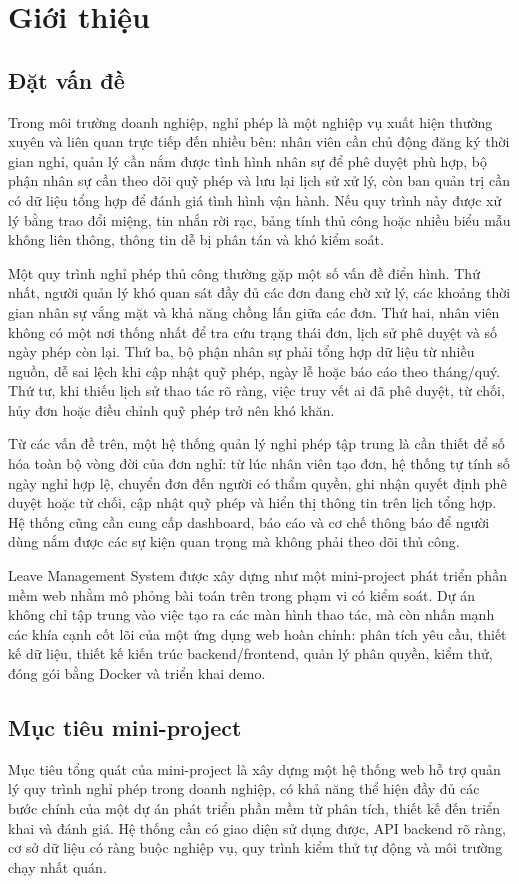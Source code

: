\chapter{Giới thiệu}

\section{Đặt vấn đề}
Trong môi trường doanh nghiệp, nghỉ phép là một nghiệp vụ xuất hiện thường xuyên và liên quan trực tiếp đến nhiều bên: nhân viên cần chủ động đăng ký thời gian nghỉ, quản lý cần nắm được tình hình nhân sự để phê duyệt phù hợp, bộ phận nhân sự cần theo dõi quỹ phép và lưu lại lịch sử xử lý, còn ban quản trị cần có dữ liệu tổng hợp để đánh giá tình hình vận hành. Nếu quy trình này được xử lý bằng trao đổi miệng, tin nhắn rời rạc, bảng tính thủ công hoặc nhiều biểu mẫu không liên thông, thông tin dễ bị phân tán và khó kiểm soát.

Một quy trình nghỉ phép thủ công thường gặp một số vấn đề điển hình. Thứ nhất, người quản lý khó quan sát đầy đủ các đơn đang chờ xử lý, các khoảng thời gian nhân sự vắng mặt và khả năng chồng lấn giữa các đơn. Thứ hai, nhân viên không có một nơi thống nhất để tra cứu trạng thái đơn, lịch sử phê duyệt và số ngày phép còn lại. Thứ ba, bộ phận nhân sự phải tổng hợp dữ liệu từ nhiều nguồn, dễ sai lệch khi cập nhật quỹ phép, ngày lễ hoặc báo cáo theo tháng/quý. Thứ tư, khi thiếu lịch sử thao tác rõ ràng, việc truy vết ai đã phê duyệt, từ chối, hủy đơn hoặc điều chỉnh quỹ phép trở nên khó khăn.

Từ các vấn đề trên, một hệ thống quản lý nghỉ phép tập trung là cần thiết để số hóa toàn bộ vòng đời của đơn nghỉ: từ lúc nhân viên tạo đơn, hệ thống tự tính số ngày nghỉ hợp lệ, chuyển đơn đến người có thẩm quyền, ghi nhận quyết định phê duyệt hoặc từ chối, cập nhật quỹ phép và hiển thị thông tin trên lịch tổng hợp. Hệ thống cũng cần cung cấp dashboard, báo cáo và cơ chế thông báo để người dùng nắm được các sự kiện quan trọng mà không phải theo dõi thủ công.

Leave Management System được xây dựng như một mini-project phát triển phần mềm web nhằm mô phỏng bài toán trên trong phạm vi có kiểm soát. Dự án không chỉ tập trung vào việc tạo ra các màn hình thao tác, mà còn nhấn mạnh các khía cạnh cốt lõi của một ứng dụng web hoàn chỉnh: phân tích yêu cầu, thiết kế dữ liệu, thiết kế kiến trúc backend/frontend, quản lý phân quyền, kiểm thử, đóng gói bằng Docker và triển khai demo.

\section{Mục tiêu mini-project}
Mục tiêu tổng quát của mini-project là xây dựng một hệ thống web hỗ trợ quản lý quy trình nghỉ phép trong doanh nghiệp, có khả năng thể hiện đầy đủ các bước chính của một dự án phát triển phần mềm từ phân tích, thiết kế đến triển khai và đánh giá. Hệ thống cần có giao diện sử dụng được, API backend rõ ràng, cơ sở dữ liệu có ràng buộc nghiệp vụ, quy trình kiểm thử tự động và môi trường chạy nhất quán.

